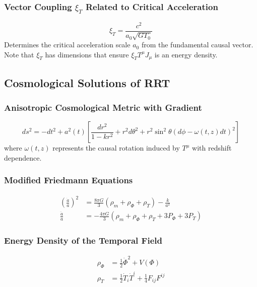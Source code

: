 \documentclass[12pt,a4paper]{article}
\begin{document}
\subsubsection{Vector Coupling \texorpdfstring{$\xi_T$}{xi\_T} Related to Critical Acceleration}
\begin{equation}
    \xi_T = \frac{c^2}{a_0 \sqrt{G T_0}}
\end{equation}
Determines the critical acceleration scale $a_0$ from the fundamental causal vector. Note that $\xi_T$ has dimensions that ensure $\xi_T T^\mu J_\mu$ is an energy density.

\subsection{Cosmological Solutions of RRT}

\subsubsection{Anisotropic Cosmological Metric with Gradient}
\begin{equation}
    ds^2 = -dt^2 + a^2(t) \left[ \frac{dr^2}{1 - kr^2} + r^2 d\theta^2 + r^2 \sin^2 \theta \left( d\phi - \omega(t, z) dt \right)^2 \right]
\end{equation}
where $\omega(t, z)$ represents the causal rotation induced by $T^\mu$ with redshift dependence.

\subsubsection{Modified Friedmann Equations}
\begin{align}
    \left( \frac{\dot{a}}{a} \right)^2 &= \frac{8\pi G}{3} (\rho_m + \rho_\Phi + \rho_T) - \frac{k}{a^2} \\
    \frac{\ddot{a}}{a} &= -\frac{4\pi G}{3} (\rho_m + \rho_\Phi + \rho_T + 3P_\Phi + 3P_T)
\end{align}

\subsubsection{Energy Density of the Temporal Field}
\begin{align}
    \rho_\Phi &= \frac{1}{2} \dot{\Phi}^2 + V(\Phi) \\
    \rho_T &= \frac{1}{2} \dot{T}_i \dot{T}^i + \frac{1}{4} F_{ij} F^{ij}
\end{align}
\end{document}
